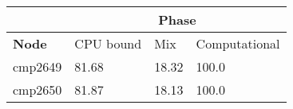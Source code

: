 \begin{tabular}{|l|l|l|l|}%
\hline%
&\multicolumn{3}{c|}{\textbf{Phase}}\\%
\hline%
\textbf{Node}&CPU bound&Mix&Computational\\%
\hline%
cmp2649&81.68&18.32&100.0\\%
cmp2650&81.87&18.13&100.0\\%
\hline%
\end{tabular}